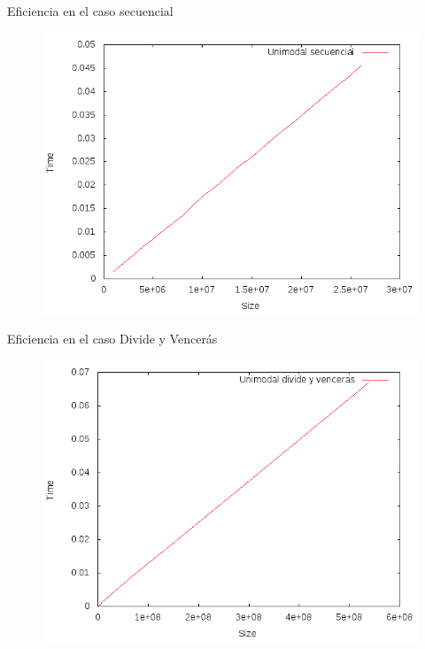 \documentclass[12pt]{beamer}
\begin{document}
\begin{frame}{Eficiencia en el caso secuencial}

\begin{figure}[H] 
\centering
\includegraphics[angle=0,scale=0.5]{img/Eficiencia_sec.png} 
\end{figure}

\end{frame}

\begin{frame}{Eficiencia en el caso Divide y Vencerás}

\begin{figure}[H] 
\centering
\includegraphics[angle=0,scale=0.5]{img/Eficiencia_dyv.png} 
\end{figure}

\end{frame}
\end{document}
